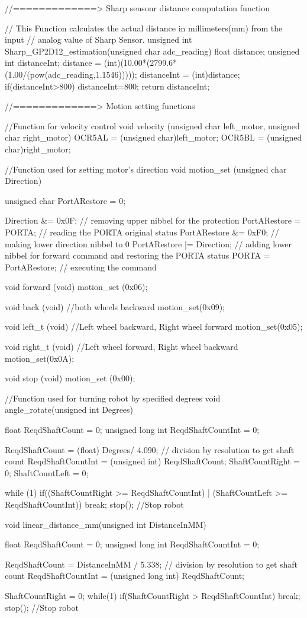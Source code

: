 //=============> Sharp sensonr distance computation function

// This Function calculates the actual distance in millimeters(mm) from the input
// analog value of Sharp Sensor.
unsigned int Sharp_GP2D12_estimation(unsigned char adc_reading)
{
	float distance;
	unsigned int distanceInt;
	distance = (int)(10.00*(2799.6*(1.00/(pow(adc_reading,1.1546)))));
	distanceInt = (int)distance;
	if(distanceInt>800)
	{
		distanceInt=800;
	}
	return distanceInt;
}


//=============> Motion setting functions

//Function for velocity control
void velocity (unsigned char left_motor, unsigned char right_motor)
{
	OCR5AL = (unsigned char)left_motor;
	OCR5BL = (unsigned char)right_motor;
}

//Function used for setting motor's direction
void motion_set (unsigned char Direction)
{
	unsigned char PortARestore = 0;

	Direction &= 0x0F; 		// removing upper nibbel for the protection
	PortARestore = PORTA; 		// reading the PORTA original status
	PortARestore &= 0xF0; 		// making lower direction nibbel to 0
	PortARestore |= Direction; // adding lower nibbel for forward command and restoring the PORTA status
	PORTA = PortARestore; 		// executing the command
}

void forward (void)
{
	motion_set (0x06);
}

void back (void) //both wheels backward
{
	motion_set(0x09);
}

void left_t (void) //Left wheel backward, Right wheel forward
{
	motion_set(0x05);
}

void right_t (void) //Left wheel forward, Right wheel backward
{
	motion_set(0x0A);
}

void stop (void)
{
	motion_set (0x00);
}

//Function used for turning robot by specified degrees
void angle_rotate(unsigned int Degrees)
{
	float ReqdShaftCount = 0;
	unsigned long int ReqdShaftCountInt = 0;

	ReqdShaftCount = (float) Degrees/ 4.090; // division by resolution to get shaft count
	ReqdShaftCountInt = (unsigned int) ReqdShaftCount;
	ShaftCountRight = 0;
	ShaftCountLeft = 0;

	while (1)
	{
		if((ShaftCountRight >= ReqdShaftCountInt) | (ShaftCountLeft >= ReqdShaftCountInt))
		break;
	}
	stop(); //Stop robot
}

void linear_distance_mm(unsigned int DistanceInMM)
{
	float ReqdShaftCount = 0;
	unsigned long int ReqdShaftCountInt = 0;

	ReqdShaftCount = DistanceInMM / 5.338; // division by resolution to get shaft count
	ReqdShaftCountInt = (unsigned long int) ReqdShaftCount;
	
	ShaftCountRight = 0;
	while(1)
	{
		if(ShaftCountRight > ReqdShaftCountInt)
		{
			break;
		}
	}
	stop(); //Stop robot
}

